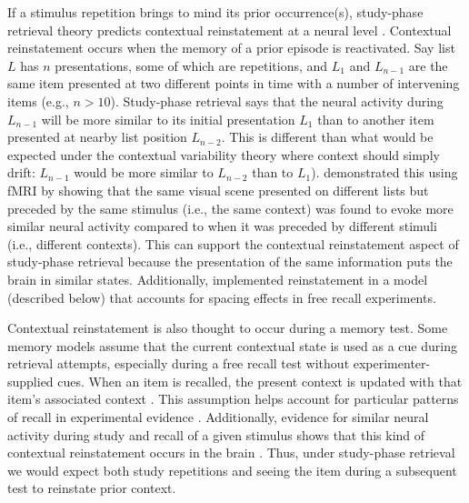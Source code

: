 \cbstart
If a stimulus repetition brings to mind its prior occurrence(s), study-phase retrieval theory predicts contextual reinstatement at a neural level \cite{HowaKaha2002}.  Contextual reinstatement occurs when the memory of a prior episode is reactivated.  Say list $L$ has $n$ presentations, some of which are repetitions, and $L_{1}$ and $L_{n-1}$ are the same item presented at two different points in time with a number of intervening items (e.g., $n>10$).  Study-phase retrieval says that the neural activity during $L_{n-1}$ will be more similar to its initial presentation $L_{1}$ than to another item presented at nearby list position $L_{n-2}$.  This is different than what would be expected under the contextual variability theory where context should simply drift: $L_{n-1}$ would be more similar to $L_{n-2}$ than to $L_{1}$).   demonstrated this using fMRI by showing that the same visual scene presented on different lists but preceded by the same stimulus (i.e., the same context) was found to evoke more similar neural activity compared to when it was preceded by different stimuli (i.e., different contexts).  This can support the contextual reinstatement aspect of study-phase retrieval because the presentation of the same information puts the brain in similar states.  Additionally,  implemented reinstatement in a model (described below) that accounts for spacing effects in free recall experiments.
\cbend


Contextual reinstatement is also thought to occur during a memory test.  Some memory models assume that the current contextual state is used as a cue during retrieval attempts, especially during a free recall test without experimenter-supplied cues.  When an item is recalled, the present context is updated with that item's associated context \cite{HowaKaha2002,SedeEtal2008}.  This assumption helps account for particular patterns of recall in experimental evidence \cite{Kaha1996,LohnKaha2014b}.
Additionally, evidence for similar neural activity during study and recall of a given stimulus shows that this kind of contextual reinstatement occurs in the brain \cite{MannEtal2011,PolyKaha2008,XueEtal2010}.
Thus, under study-phase retrieval we would expect both study repetitions and seeing the item during a subsequent test to reinstate prior context.

